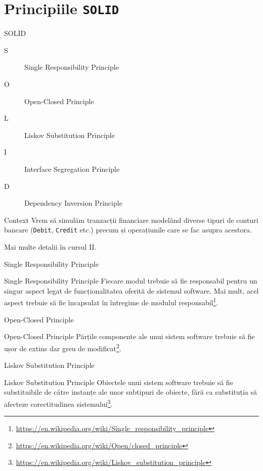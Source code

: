 \documentclass[presentation]{beamer}
\begin{document}
\section{Principiile \texttt{SOLID}}
\label{sec:orgb90eed9}
\begin{frame}[label={sec:org7cd0d8a}]{SOLID}
\begin{description}
\item[{S}] Single Responsibility Principle
\item[{O}] Open-Closed Principle
\item[{L}] Liskov Substitution Principle
\item[{I}] Interface Segregation Principle
\item[{D}] Dependency Inversion Principle
\end{description}
\end{frame}
\begin{frame}[label={sec:org582b83c},fragile]{Context}
 Vrem să simulăm tranzacții financiare modelând diverse tipuri de conturi bancare (\texttt{Debit}, \texttt{Credit} etc.) precum și operațiunile care se fac asupra acestora.

Mai multe detalii în cursul II.
\end{frame}
\begin{frame}[label={sec:org21097bd}]{Single Responsibility Principle}
\begin{block}{Single Responsibility Principle}
Fiecare modul trebuie să fie responsabil pentru un singur aspect legat de funcționalitatea oferită de sistemul software. Mai mult, acel aspect trebuie să fie încapsulat în întregime de modulul responsabil\footnote{\url{https://en.wikipedia.org/wiki/Single\_responsibility\_principle}}.
\end{block}
\end{frame}
\begin{frame}[label={sec:orga1204be}]{Open-Closed Principle}
\begin{block}{Open-Closed Principle}
Părțile componente ale unui sistem software trebuie să fie ușor de extins dar greu de modificat\footnote{\url{https://en.wikipedia.org/wiki/Open/closed\_principle}}.
\end{block}
\end{frame}
\begin{frame}[label={sec:orgdc66d77}]{Liskov Substitution Principle}
\begin{block}{Liskov Substitution Principle}
Obiectele unui sistem software trebuie să fie substituibile de către instanțe ale unor subtipuri de obiecte, fără ca substituția să afecteze corectitudinea sistemului\footnote{\url{https://en.wikipedia.org/wiki/Liskov\_substitution\_principle}}.
\end{block}
\end{frame}
\end{document}
